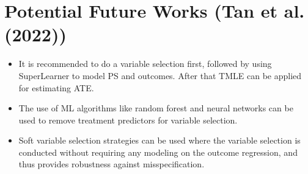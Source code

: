 \documentclass[letterpaper,10pt,english]{jupyterBook}
\begin{document}
\section{Potential Future Works (Tan et al. (2022))}
\label{\detokenize{Conclusion:potential-future-works-tan-et-al-2022}}\begin{itemize}
\item {} 
\sphinxAtStartPar
It is recommended to do a variable selection first, followed by using SuperLearner to model PS and outcomes. After that TMLE can be applied for estimating ATE.

\item {} 
\sphinxAtStartPar
The use of ML algorithms like random forest and neural networks can be used to remove treatment predictors for variable selection.

\item {} 
\sphinxAtStartPar
Soft variable selection strategies can be used where the variable selection is conducted without requiring any modeling on the outcome regression, and thus provides robustness against mis\sphinxhyphen{}specification.

\end{itemize}







\renewcommand{\indexname}{Index}
\printindex
\end{document}
